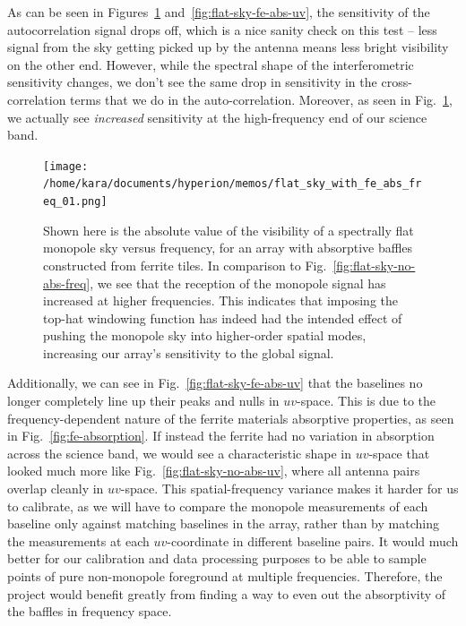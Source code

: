As can be seen in Figures~\ref{fig:flat-sky-fe-abs-freq} 
and~\ref{fig:flat-sky-fe-abs-uv}, the sensitivity of the autocorrelation signal 
drops off, which is a nice sanity check on this test -- less signal from the 
sky getting picked up by the antenna means less bright visibility on the other 
end. However, while the spectral shape of the interferometric sensitivity 
changes, we don't see the same drop in sensitivity in the cross-correlation 
terms that we do in the auto-correlation. Moreover, as seen in 
Fig.~\ref{fig:flat-sky-fe-abs-freq}, we actually see \emph{increased} 
sensitivity at the high-frequency end of our science band.

\begin{figure}
    \begin{center}
    \texttt{[image: /home/kara/documents/hyperion/memos/flat\_sky\_with\_fe\_abs\_freq\_01.png]}
    \end{center}
    \caption{
        Shown here is the absolute value of the visibility of a spectrally flat 
        monopole sky versus frequency, for an array with absorptive baffles 
        constructed from ferrite tiles. In comparison to 
        Fig.~\ref{fig:flat-sky-no-abs-freq}, we see that the reception of the 
        monopole signal has increased at higher frequencies. This indicates 
        that imposing the top-hat windowing function has indeed had the 
        intended effect of pushing the monopole sky into higher-order spatial 
        modes, increasing our array's sensitivity to the global signal.
    }
    \label{fig:flat-sky-fe-abs-freq}
\end{figure}

Additionally, we can see in Fig.~\ref{fig:flat-sky-fe-abs-uv} that the 
baselines no longer completely line up their peaks and nulls in $uv$-space.  
This is due to the frequency-dependent nature of the ferrite materials 
absorptive properties, as seen in Fig.~\ref{fig:fe-absorption}. If instead the 
ferrite had no variation in absorption across the science band, we would see a 
characteristic shape in $uv$-space that looked much more like 
Fig.~\ref{fig:flat-sky-no-abs-uv}, where all antenna pairs overlap cleanly in 
$uv$-space. This spatial-frequency variance makes it harder for us to 
calibrate, as we will have to compare the monopole measurements of each 
baseline only against matching baselines in the array, rather than by matching 
the measurements at each $uv$-coordinate in different baseline pairs. It would 
much better for our calibration and data processing purposes to be able to 
sample points of pure non-monopole foreground at multiple frequencies.  
Therefore, the project would benefit greatly from finding a way to even out the 
absorptivity of the baffles in frequency space.

